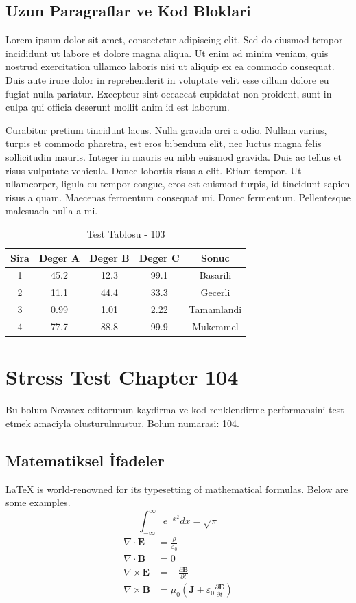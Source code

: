 \documentclass[12pt,a4paper]{article}
\begin{document}
\subsection{Uzun Paragraflar ve Kod Bloklari}
Lorem ipsum dolor sit amet, consectetur adipiscing elit. Sed do eiusmod tempor incididunt ut labore et dolore magna aliqua. Ut enim ad minim veniam, quis nostrud exercitation ullamco laboris nisi ut aliquip ex ea commodo consequat. Duis aute irure dolor in reprehenderit in voluptate velit esse cillum dolore eu fugiat nulla pariatur. Excepteur sint occaecat cupidatat non proident, sunt in culpa qui officia deserunt mollit anim id est laborum.

Curabitur pretium tincidunt lacus. Nulla gravida orci a odio. Nullam varius, turpis et commodo pharetra, est eros bibendum elit, nec luctus magna felis sollicitudin mauris. Integer in mauris eu nibh euismod gravida. Duis ac tellus et risus vulputate vehicula. Donec lobortis risus a elit. Etiam tempor. Ut ullamcorper, ligula eu tempor congue, eros est euismod turpis, id tincidunt sapien risus a quam. Maecenas fermentum consequat mi. Donec fermentum. Pellentesque malesuada nulla a mi.

\begin{table}[h!]
\centering
\begin{tabular}{|c|c|c|c|c|}
\hline
\textbf{Sira} & \textbf{Deger A} & \textbf{Deger B} & \textbf{Deger C} & \textbf{Sonuc} \\
\hline
1 & 45.2 & 12.3 & 99.1 & Basarili \\
2 & 11.1 & 44.4 & 33.3 & Gecerli \\
3 & 0.99 & 1.01 & 2.22 & Tamamlandi \\
4 & 77.7 & 88.8 & 99.9 & Mukemmel \\
\hline
\end{tabular}
\caption{Test Tablosu - 103}
\end{table}

\newpage
\section{Stress Test Chapter 104}
Bu bolum Novatex editorunun kaydirma ve kod renklendirme performansini test etmek amaciyla olusturulmustur. Bolum numarasi: 104.

\subsection{Matematiksel İfadeler}
\LaTeX{} is world-renowned for its typesetting of mathematical formulas. Below are some examples.
\begin{equation}
\int_{-\infty}^{\infty} e^{-x^2} dx = \sqrt{\pi}
\end{equation}
\begin{align}
\nabla \cdot \mathbf{E} &= \frac{\rho}{\varepsilon_0} \\
\nabla \cdot \mathbf{B} &= 0 \\
\nabla \times \mathbf{E} &= -\frac{\partial \mathbf{B}}{\partial t} \\
\nabla \times \mathbf{B} &= \mu_0\left(\mathbf{J} + \varepsilon_0 \frac{\partial \mathbf{E}}{\partial t}\right)
\end{align}
\end{document}
